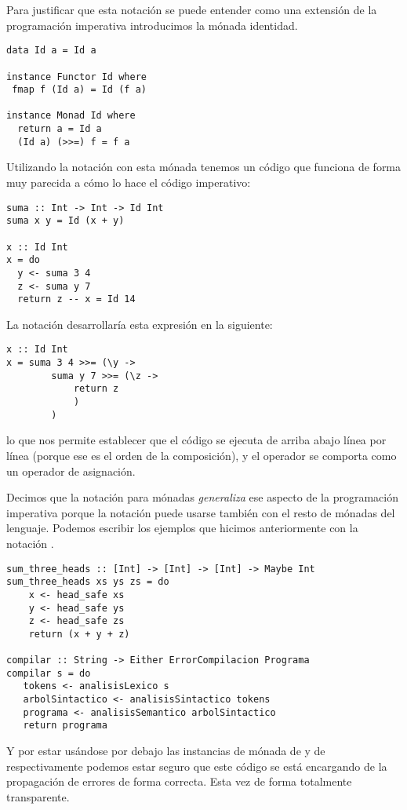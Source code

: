 Para justificar que esta notación
se puede entender como una extensión de la programación imperativa
introducimos la mónada identidad.
\begin{verbatim}
data Id a = Id a

instance Functor Id where
 fmap f (Id a) = Id (f a)

instance Monad Id where
  return a = Id a
  (Id a) (>>=) f = f a
\end{verbatim}
Utilizando la notación  con esta mónada tenemos
un código que funciona de forma muy parecida a cómo lo hace
el código imperativo:
\begin{verbatim}
suma :: Int -> Int -> Id Int
suma x y = Id (x + y)

x :: Id Int
x = do
  y <- suma 3 4
  z <- suma y 7
  return z -- x = Id 14
\end{verbatim}
La notación  desarrollaría esta expresión en la siguiente:
\begin{verbatim}
x :: Id Int
x = suma 3 4 >>= (\y ->
        suma y 7 >>= (\z ->
            return z
            )
        )
\end{verbatim}
lo que nos permite establecer que el código se ejecuta de arriba
abajo línea por línea (porque ese es el orden de la composición),
y el operador \cod{<-} se comporta como un operador de asignación.

Decimos que la notación  para mónadas \textit{generaliza} ese
aspecto de la programación imperativa porque la notación
 puede usarse también con el resto de mónadas del lenguaje.
Podemos escribir los ejemplos
que hicimos anteriormente con la notación .
\begin{verbatim}
sum_three_heads :: [Int] -> [Int] -> [Int] -> Maybe Int
sum_three_heads xs ys zs = do
    x <- head_safe xs
    y <- head_safe ys
    z <- head_safe zs
    return (x + y + z)

compilar :: String -> Either ErrorCompilacion Programa
compilar s = do
   tokens <- analisisLexico s
   arbolSintactico <- analisisSintactico tokens
   programa <- analisisSemantico arbolSintactico
   return programa
\end{verbatim}
Y por estar usándose por debajo las instancias de mónada
de  y de  respectivamente podemos
estar seguro que este código se está encargando de la propagación
de errores de forma correcta. Esta vez de forma totalmente transparente.

